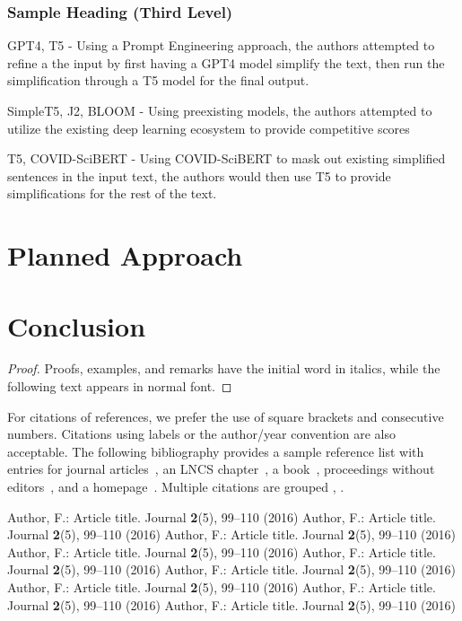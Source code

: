 \documentclass[runningheads]{llncs}
\begin{document}
\subsubsection{Sample Heading (Third Level)} 
GPT4, T5 - Using a Prompt Engineering approach, the authors attempted to refine a the input by first having a GPT4 model simplify the text, then run the simplification through a T5 model for the final output.

SimpleT5, J2, BLOOM - Using preexisting models, the authors attempted to utilize the existing deep learning ecosystem to provide competitive scores

T5, COVID-SciBERT - Using COVID-SciBERT to mask out existing simplified sentences in the input text, the authors would then use T5 to provide simplifications for the rest of the text. 
\section{Planned Approach}
\section{Conclusion}

%
%
\begin{proof}
Proofs, examples, and remarks have the initial word in italics,
while the following text appears in normal font.
\end{proof}
For citations of references, we prefer the use of square brackets
and consecutive numbers. Citations using labels or the author/year
convention are also acceptable. The following bibliography provides
a sample reference list with entries for journal
articles~\cite{ref_article1}, an LNCS chapter~\cite{ref_lncs1}, a
book~\cite{ref_book1}, proceedings without editors~\cite{ref_proc1},
and a homepage~\cite{ref_url1}. Multiple citations are grouped
\cite{ref_article1,ref_lncs1,ref_book1},
\cite{ref_article1,ref_book1,ref_proc1,ref_url1}.
%
%
%
% 
% 
%
\begin{thebibliography}{9}
Author, F.: Article title. Journal \textbf{2}(5), 99--110 (2016)
Author, F.: Article title. Journal \textbf{2}(5), 99--110 (2016)
Author, F.: Article title. Journal \textbf{2}(5), 99--110 (2016)
Author, F.: Article title. Journal \textbf{2}(5), 99--110 (2016)
Author, F.: Article title. Journal \textbf{2}(5), 99--110 (2016)
Author, F.: Article title. Journal \textbf{2}(5), 99--110 (2016)
Author, F.: Article title. Journal \textbf{2}(5), 99--110 (2016)
Author, F.: Article title. Journal \textbf{2}(5), 99--110 (2016)
Author, F.: Article title. Journal \textbf{2}(5), 99--110 (2016)

\end{thebibliography}
\end{document}
